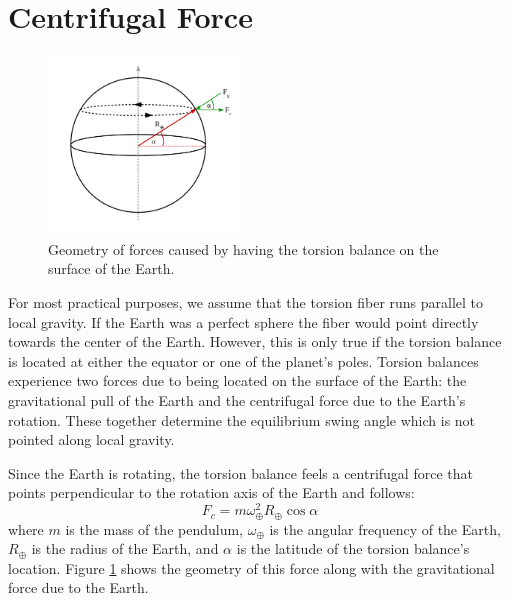 \documentclass{book}
\begin{document}
\section{Centrifugal Force}

\begin{figure}[!h]
\begin{centering}
\includegraphics[width=0.45\textwidth]{Centrifugal.pdf}
\caption{Geometry of forces caused by having the torsion balance on the surface of the Earth.}\label{centFig}
\end{centering}
\end{figure}

For most practical purposes, we assume that the torsion fiber runs parallel to local gravity. If the Earth was a perfect sphere the fiber would point directly towards the center of the Earth. However, this is only true if the torsion balance is located at either the equator or one of the planet's poles. Torsion balances experience two forces due to being located on the surface of the Earth: the gravitational pull of the Earth and the centrifugal force due to the Earth's rotation. These together determine the equilibrium swing angle which is not pointed along local gravity.

Since the Earth is rotating, the torsion balance feels a centrifugal force that points perpendicular to the rotation axis of the Earth and follows:
\begin{equation}
F_c= m \omega_\oplus^2R_\oplus \cos \alpha
\end{equation}
where $m$ is the mass of the pendulum, $\omega_\oplus$ is the angular frequency of the Earth, $R_\oplus$ is the radius of the Earth, and $\alpha$ is the latitude of the torsion balance's location. Figure \ref{centFig} shows the geometry of this force along with the gravitational force due to the Earth.
\end{document}
